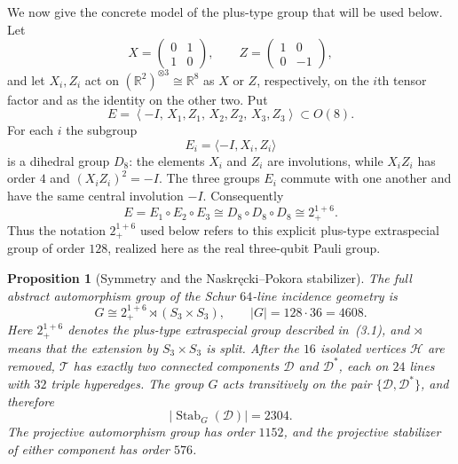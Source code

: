 \documentclass[10pt]{article}
\newtheorem{proposition}{Proposition}[section]
\newcommand{\R}{\mathbb R}
\begin{document}
We now give the concrete model of the plus-type group that will be used
below.  Let
\[
X=\begin{pmatrix}0&1\\1&0\end{pmatrix},
\qquad
Z=\begin{pmatrix}1&0\\0&-1\end{pmatrix},
\]
and let $X_i,Z_i$ act on
$(\R^2)^{\otimes3}\cong\R^8$ as $X$ or $Z$, respectively, on the
$i$th tensor factor and as the identity on the other two.  Put
\[
E=
\left\langle
-I,\,
X_1,Z_1,\,
X_2,Z_2,\,
X_3,Z_3
\right\rangle
\subset O(8).
\tag{3.1}
\]
For each $i$ the subgroup
\[
E_i=\langle -I,X_i,Z_i\rangle
\]
is a dihedral group $D_8$: the elements $X_i$ and $Z_i$ are involutions,
while $X_iZ_i$ has order $4$ and $(X_iZ_i)^2=-I$.  The three groups
$E_i$ commute with one another and have the same central involution
$-I$.  Consequently
\[
E=E_1\circ E_2\circ E_3
   \cong D_8\circ D_8\circ D_8
   \cong 2_{+}^{1+6}.
\]
Thus the notation $2_{+}^{1+6}$ used below refers to this explicit
plus-type extraspecial group of order $128$, realized here as the real
three-qubit Pauli group.

\begin{proposition}[Symmetry and the Naskr\k{e}cki--Pokora stabilizer]\label{prop:schur64-symmetry}
The full abstract automorphism group of the Schur $64$-line incidence geometry is
\[
G\cong 2_{+}^{1+6}\rtimes(S_3\times S_3),\qquad |G|=128\cdot36=4608.
\tag{3.2}
\]
Here $2_{+}^{1+6}$ denotes the plus-type extraspecial group described
in~(3.1), and $\rtimes$ means that the extension by
$S_3\times S_3$ is split.  After the $16$ isolated vertices $\mathcal H$ are removed, $\mathcal T$ has exactly two connected components $\mathcal D$ and $\mathcal D^*$, each on $24$ lines with $32$ triple hyperedges.  The group $G$ acts transitively on the pair $\{\mathcal D,\mathcal D^*\}$, and therefore
\[
|\operatorname{Stab}_G(\mathcal D)|=2304.
\tag{3.3}
\]
The projective automorphism group has order $1152$, and the projective stabilizer of either component has order $576$.
\end{proposition}
\end{document}
